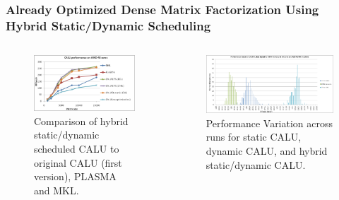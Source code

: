 \begin{frame}[label=hybstatdyndmf]
\frametitle{Already Optimized Dense Matrix Factorization Using Hybrid Static/Dynamic Scheduling}
\vspace*{-0.2in}
\begin{columns}
\begin{figure}[ht!] 
\includegraphics[scale=0.22]{./plots/calu-fastNUMA4-perf}
\caption{\tiny Comparison of hybrid static/dynamic scheduled CALU to original CALU (first version), PLASMA and MKL.}
\end{figure}
\begin{figure}
\includegraphics[scale=0.10]{./plots/calu-fastNUMA3-histogram}
\caption{\tiny Performance Variation across runs for static CALU, dynamic CALU, and hybrid static/dynamic CALU.}

\end{figure}
\end{columns}
\end{frame}
